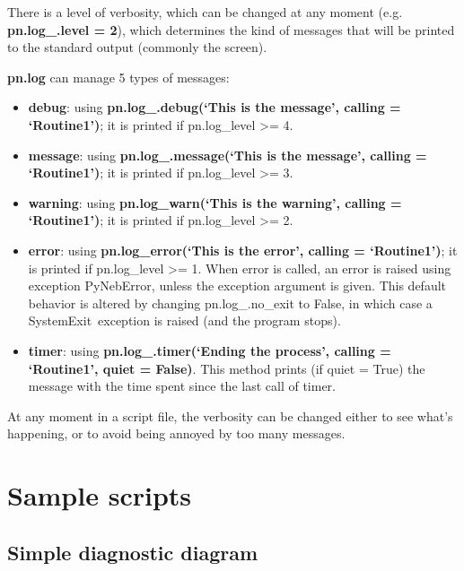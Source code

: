 \documentclass{report}
\begin{document}
There is a level of verbosity, which can be changed at any moment (e.g.
\textbf{pn.log\_.level = 2}), which determines the kind of messages that
will be printed to the standard output (commonly the screen).

\textbf{pn.log} can manage 5 types of messages:

\begin{itemize}
\itemsep1pt\parskip0pt
\item
  \textbf{debug}: using \textbf{pn.log\_.debug(`This is the message',
  calling = `Routine1')}; it is printed if pn.log\_level \textgreater{}=
  4.
\item
  \textbf{message}: using \textbf{pn.log\_.message(`This is the
  message', calling = `Routine1')}; it is printed if pn.log\_level
  \textgreater{}= 3.
\item
  \textbf{warning}: using \textbf{pn.log\_warn(`This is the warning',
  calling = `Routine1')}; it is printed if pn.log\_level \textgreater{}=
  2.
\item
  \textbf{error}: using \textbf{pn.log\_error(`This is the error',
  calling = `Routine1')}; it is printed if pn.log\_level \textgreater{}=
  1. When error is called, an error is raised using exception
  PyNebError, unless the exception argument is given. This default
  behavior is altered by changing pn.log\_.no\_exit to False, in which
  case a SystemExit~exception is raised (and the program stops).
\item
  \textbf{timer}: using \textbf{pn.log\_.timer(`Ending the process',
  calling = `Routine1', quiet = False)}. This method prints (if quiet =
  True) the message with the time spent since the last call of timer.
\end{itemize}

At any moment in a script file, the verbosity can be changed either to
see what's happening, or to avoid being annoyed by too many messages.

\chapter{Sample scripts}\label{sample-scripts}

\section{Simple diagnostic diagram}\label{simple-diagnostic-diagram}
\end{document}
